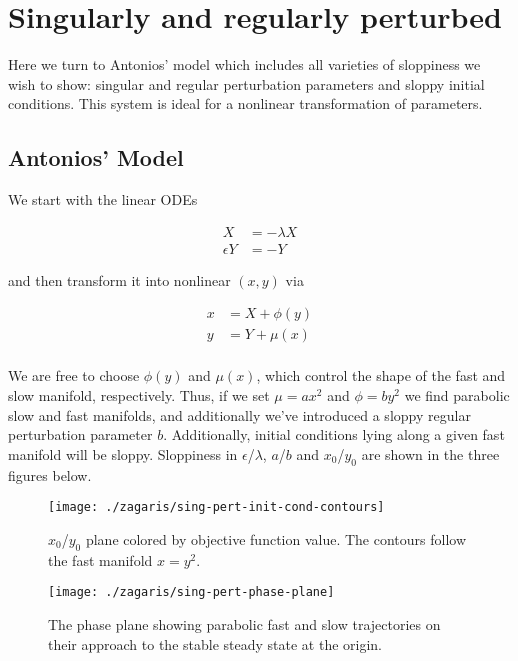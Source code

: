 \documentclass[11pt]{article}
\begin{document}
\section{Singularly and regularly perturbed}

Here we turn to Antonios' model which includes all varieties of sloppiness we wish to show: singular and regular perturbation parameters and sloppy initial conditions. This system is ideal for a nonlinear transformation of parameters.

\subsection{Antonios' Model}

We start with the linear ODEs

\begin{align*}
  X &= -\lambda X \\
  \epsilon Y &= -Y
\end{align*}

and then transform it into nonlinear $(x, y)$ via 

\begin{align*}
  x &= X + \phi(y) \\
  y &= Y + \mu(x) \\
\end{align*}

We are free to choose $\phi(y)$ and $\mu(x)$, which control the shape of the fast and slow manifold, respectively. Thus, if we set $\mu = a x^2$ and $\phi = b y^2$ we find parabolic slow and fast manifolds, and additionally we've introduced a sloppy regular perturbation parameter $b$. Additionally, initial conditions lying along a given fast manifold will be sloppy. Sloppiness in $\epsilon$/$\lambda$, $a$/$b$ and $x_0$/$y_0$ are shown in the three figures below.

\begin{figure}[htbp]
  \centering
  \texttt{[image: ./zagaris/sing-pert-init-cond-contours]}
  \caption{$x_0$/$y_0$ plane colored by objective function value. The contours follow the fast manifold $x=y^2$.}
\end{figure}

\begin{figure}[htbp]
  \centering
  \texttt{[image: ./zagaris/sing-pert-phase-plane]}
  \caption{The phase plane showing parabolic fast and slow
    trajectories on their approach to the stable steady state at the origin.}
\end{figure}
\end{document}
